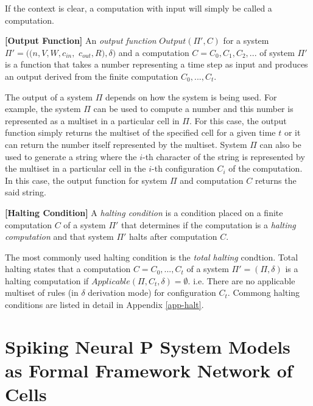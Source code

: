 \documentclass[a4paper]{article}
\theoremstyle{definition}
\begin{document}
If the context is clear, a computation with input will simply be called a computation.


\label{def-output} \textbf{[Output Function]} An \emph{output function} 
$Output(\Pi',C)$ for a system $\Pi' = ((n,V,W,c_{in},$ $c_{out},R),\delta)$ and a computation 
$C=C_0,C_1,C_2,...$ of system $\Pi'$ is a function that takes a number representing a time step
as input and produces an output derived from the finite computation $C_0,...,C_t$.

The output of a system $\Pi$ depends on how the system is being used. For example, the system $\Pi$
can be used to compute a number and this number is represented as a multiset in a particular cell in
$\Pi$. For this case, the output function simply returns the multiset of the specified cell for a 
given time $t$ or it can return the number itself represented by the multiset. System $\Pi$ can also 
be used to generate a string where the $i$-th character of the string is represented by the multiset 
in a particular cell in the $i$-th configuration $C_i$ of the computation. In this case, the output 
function for system $\Pi$ and computation $C$ returns the said string.


\label{def-halt}\textbf{[Halting Condition]} A \emph{halting condition} is a condition
placed on a finite computation $C$ of a system $\Pi'$ that determines if the computation is a 
\emph{halting computation} and that system $\Pi'$ halts after computation $C$.

The most commonly used halting condition is the \emph{total halting} condtion. Total halting states
that a computation $C = C_0,...,C_t$ of a system $\Pi'=(\Pi,\delta)$ is a halting computation if 
$Applicable(\Pi,C_t,\delta) = \emptyset$. i.e. There are no applicable multiset of rules (in 
$\delta$ derivation mode) for configuration $C_t$. Commong halting conditions are listed in detail
in Appendix \ref{app-halt}.


\section{Spiking Neural P System Models as Formal Framework Network of Cells} 
\end{document}
